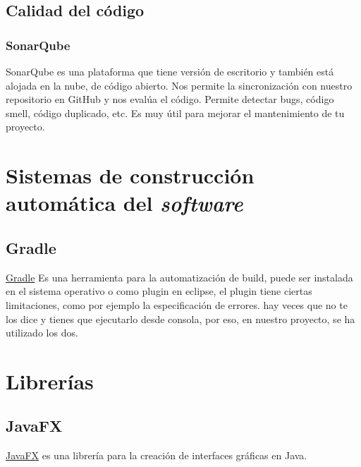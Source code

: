 
\subsection{Calidad del código}\label{calidad-del-codigo}

\subsubsection{SonarQube}\label{sonarqube}

SonarQube es una plataforma que tiene versión de escritorio y también está alojada en la nube, de código abierto. Nos permite la sincronización con nuestro repositorio en GitHub y nos evalúa el código. Permite detectar bugs, código smell, código duplicado, etc. Es muy útil para mejorar el mantenimiento de tu proyecto. \cite{web:sonarqube}

\section{Sistemas de construcción automática del
	\emph{software}}\label{sistemas-de-construccion-automuxe1tica-del-software}



\subsection{Gradle}\label{gradle}
\href{https://gradle.org/}{Gradle} Es una herramienta para la automatización de build, puede ser instalada en el sistema operativo o como plugin en eclipse, el plugin tiene ciertas limitaciones, como por ejemplo la especificación de errores. hay veces que no te los dice y tienes que ejecutarlo desde consola, por eso, en nuestro proyecto, se ha utilizado los dos.


\section{Librerías}\label{libreruxedas}


\subsection{JavaFX}\label{javafx}

\href{http://docs.oracle.com/javase/8/javase-clienttechnologies.htm}{JavaFX}
es una librería para la creación de interfaces gráficas en Java.

